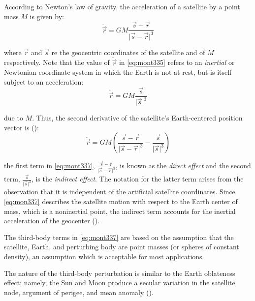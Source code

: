 According to Newton's law of gravity, the acceleration of a satellite by a point 
mass \(M\) is given by:
\begin{equation}
  \label{eq:mont335}
  \ddot{\vec{r}} = G M \frac{\vec{s} - \vec{r}}{\lvert \vec{s} - \vec{r} {\rvert}^3}
\end{equation}

where \(\vec{r}\) and \(\vec{s}\) re the geocentric coordinates of the satellite 
and of \(M\) respectively. Note that the value of \(\ddot{\vec{r}}\) in \ref{eq:mont335} 
refers to an \emph{inertial} or Newtonian coordinate system in which the Earth is 
not at rest, but is itself subject to an acceleration:
\begin{equation}
  \ddot{\vec{r}} = G M \frac{\vec{s}}{\lvert \vec{s} {\rvert}^3}
\end{equation}

due to \(M\). Thus, the second derivative of the satellite's Earth-centered position 
vector is (\cite{Montenbruck2000}):
\begin{equation}
  \label{eq:mont337}
  \ddot{\vec{r}} = G M \left( \frac{\vec{s} - \vec{r}}{\lvert \vec{s} - \vec{r} {\rvert}^3} 
   - \frac{\vec{s}}{\lvert \vec{s} {\rvert}^3} \right)
\end{equation}

the first term in \ref{eq:mont337}, \(\frac{\vec{s} - \vec{r}}{\lvert \vec{s} - \vec{r} {\rvert}^3}\), 
is known as the \emph{direct effect} and the second term, \(\frac{\vec{s}}{\lvert \vec{s} {\rvert}^3}\), 
is the \emph{indirect effect}. The notation for the latter term arises from the observation that it
is independent of the artificial satellite coordinates. Since \ref{eq:mon337} describes
the satellite motion with respect to the Earth center of mass, which is a noninertial
point, the indirect term accounts for the inertial acceleration of the geocenter 
(\cite{tapley}). 

The third-body terms in \ref{eq:mont337} are based on the assumption that the
satellite, Earth, and perturbing body are point masses (or spheres of constant 
density), an assumption which is acceptable for most applications.

The nature of the third-body perturbation is similar to the Earth oblateness
effect; namely, the Sun and Moon produce a secular variation in the satellite node,
argument of perigee, and mean anomaly (\cite{tapley}).

